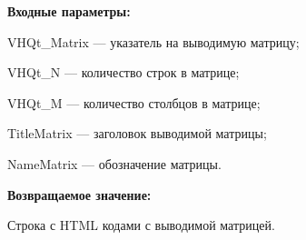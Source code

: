 \textbf{Входные параметры:}
 
    VHQt\_Matrix --- указатель на выводимую матрицу;
 
    VHQt\_N --- количество строк в матрице;
 
    VHQt\_M --- количество столбцов в матрице;
 
    TitleMatrix --- заголовок выводимой матрицы;
 
    NameMatrix --- обозначение матрицы.

\textbf{Возвращаемое значение:}

Строка с HTML кодами с выводимой матрицей.